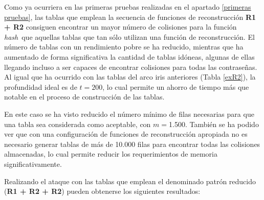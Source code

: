 \documentclass[12pt,spanish,listoffigures,listoftables,listofalgorithms]{tfgetsinf}
\newcommand{\hash}{\textit{hash}}
\begin{document}
Como ya ocurriera en las primeras pruebas realizadas en el apartado \ref{primeras pruebas}, las tablas que emplean la secuencia de funciones de reconstrucción \textbf{R1 + R2} consiguen encontrar un mayor número de colisiones para la función \hash~que aquellas tablas que tan sólo utilizan una función de reconstrucción. El número de tablas con un rendimiento pobre se ha reducido, mientras que ha aumentado de forma significativa la cantidad de tablas idóneas, algunas de ellas llegando incluso a ser capaces de encontrar colisiones para todas las contraseñas. Al igual que ha ocurrido con las tablas del arco iris anteriores (Tabla \ref{exR2}), la profundidad ideal es de $t = 200$, lo cual permite un ahorro de tiempo más que notable en el proceso de construcción de las tablas.

En este caso se ha visto reducido el número mínimo de filas necesarias para que una tabla sea considerada como aceptable, con $m = $1.500. También se ha podido ver que con una configuración de funciones de reconstrucción apropiada no es necesario generar tablas de más de 10.000 filas para encontrar todas las colisiones almacenadas, lo cual permite reducir los requerimientos de memoria significativamente.

Realizando el ataque con las tablas que emplean el denominado patrón reducido (\textbf{R1 + R2 + R2}) pueden obtenerse los siguientes resultados:
\end{document}
